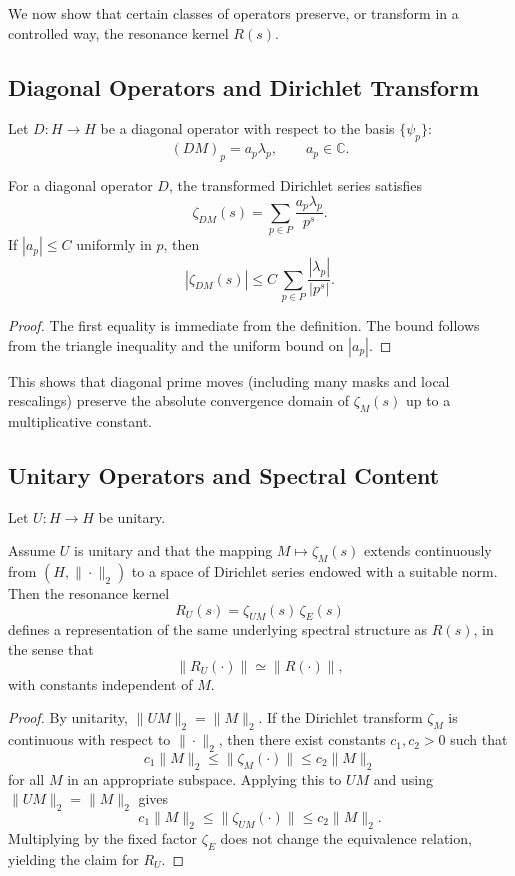 \documentclass[11pt]{article}
\begin{document}
We now show that certain classes of operators preserve, or transform in a controlled way, the resonance kernel $R(s)$.

\subsection{Diagonal Operators and Dirichlet Transform}

Let $D:H\to H$ be a diagonal operator with respect to the basis $\{\psi_p\}$:
\[
(D M)_p = a_p \lambda_p, \qquad a_p\in\mathbb{C}.
\]

\begin{proposition}
\label{prop:diag-dirichlet}
For a diagonal operator $D$, the transformed Dirichlet series satisfies
\[
\zeta_{D M}(s) = \sum_{p\in P} \frac{a_p \lambda_p}{p^s}.
\]
If $|a_p|\leq C$ uniformly in $p$, then
\[
|\zeta_{D M}(s)| \leq C \,\sum_{p\in P} \frac{|\lambda_p|}{|p^s|}.
\]
\end{proposition}

\begin{proof}
The first equality is immediate from the definition.
The bound follows from the triangle inequality and the uniform bound on $|a_p|$.
\end{proof}

This shows that diagonal prime moves (including many masks and local rescalings) preserve the absolute convergence domain of $\zeta_M(s)$ up to a multiplicative constant.

\subsection{Unitary Operators and Spectral Content}

Let $U:H\to H$ be unitary.

\begin{proposition}
\label{prop:unitary-resonance}
Assume $U$ is unitary and that the mapping $M\mapsto \zeta_M(s)$ extends continuously from $(H,\|\cdot\|_2)$ to a space of Dirichlet series endowed with a suitable norm.
Then the resonance kernel
\[
R_U(s) = \zeta_{U M}(s)\,\zeta_E(s)
\]
defines a representation of the same underlying spectral structure as $R(s)$, in the sense that
\[
\|R_U(\cdot)\| \simeq \|R(\cdot)\|,
\]
with constants independent of $M$.
\end{proposition}

\begin{proof}
By unitarity, $\|UM\|_2 = \|M\|_2$.
If the Dirichlet transform $\zeta_M$ is continuous with respect to $\|\cdot\|_2$, then there exist constants $c_1,c_2>0$ such that
\[
c_1 \|M\|_2 \leq \|\zeta_M(\cdot)\| \leq c_2 \|M\|_2
\]
for all $M$ in an appropriate subspace.
Applying this to $UM$ and using $\|UM\|_2=\|M\|_2$ gives
\[
c_1 \|M\|_2 \leq \|\zeta_{U M}(\cdot)\| \leq c_2 \|M\|_2.
\]
Multiplying by the fixed factor $\zeta_E$ does not change the equivalence relation, yielding the claim for $R_U$.
\end{proof}
\end{document}
